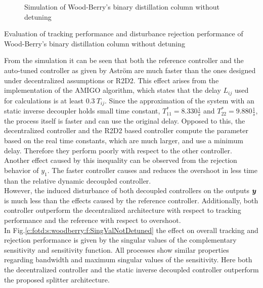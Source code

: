 \begin{figure}[H]\centering

\caption{Simulation of Wood-Berry's binary distillation column without detuning}
\label{c:fotd:s:woodberry:f:SimNotDetuned}
\end{figure}

\begin{table}[H]
\centering
\caption{Evaluation of tracking performance and disturbance rejection performance of Wood-Berry's binary distillation column without detuning}
\label{c:fotd:s:woodberry:tab:eval1}

\end{table}

From the simulation it can be seen that both the reference controller and the auto-tuned controller as given by Astr\"om are much faster than the ones designed under decentralized assumptions or R2D2. This effect arises from the implementation of the AMIGO algorithm, which states that the delay $L_{ij}$ used for calculations is at least $0.3~T_{ij}$. Since the approximation of the system with an static inverse decoupler holds small time constant, $T_{11}^* = 8.330 \frac{1}{s}$ and $T_{22}^* = 9.880 \frac{1}{s}$, the process itself is faster and can use the original delay. Opposed to this, the decentralized controller and the R2D2 based controller compute the parameter based on the real time constants, which are much larger, and use a minimum delay. Therefore they perform poorly with respect to the other controller.\\

Another effect caused by this inequality can be observed from the rejection behavior of $y_1$. The faster controller causes and reduces the overshoot in less time than the relative dynamic decoupled controller.\\

However, the induced disturbance of both decoupled controllers on the outputs $\mbox{\boldmath$y$}$ is much less than the effects caused by the reference controller.  Additionally, both controller outperform the decentralized architecture with respect to tracking performance and the reference with respect to overshoot.\\


In Fig.\ref{c:fotd:s:woodberry:f:SingValNotDetuned} the effect on overall tracking and rejection performance is given by the singular values of the complementary sensitivity and sensitivity function. All processes show similar properties regarding bandwidth and maximum singular values of the sensitivity. Here both the decentralized controller and the static inverse decoupled controller outperform the proposed splitter architecture.

